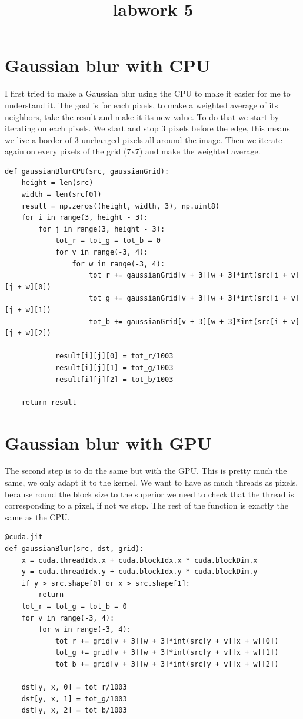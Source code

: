\documentclass{report}
\begin{document}
\title{labwork 5}
\maketitle

\section{Gaussian blur with CPU}
I first tried to make a Gaussian blur using the CPU to make it easier for me to understand it. The goal is for each pixels, to make a weighted average of its neighbors, take the result and make it its new value.
\newline
\newline
To do that we start by iterating on each pixels. We start and stop 3 pixels before the edge, this means we live a border of 3 unchanged pixels all around the image.
\newline
Then we iterate again on every pixels of the grid (7x7) and make the weighted average.
\begin{lstlisting}
def gaussianBlurCPU(src, gaussianGrid):
    height = len(src)
    width = len(src[0])
    result = np.zeros((height, width, 3), np.uint8)
    for i in range(3, height - 3):
        for j in range(3, height - 3):
            tot_r = tot_g = tot_b = 0
            for v in range(-3, 4):
                for w in range(-3, 4):
                    tot_r += gaussianGrid[v + 3][w + 3]*int(src[i + v][j + w][0])
                    tot_g += gaussianGrid[v + 3][w + 3]*int(src[i + v][j + w][1])
                    tot_b += gaussianGrid[v + 3][w + 3]*int(src[i + v][j + w][2])
        
            result[i][j][0] = tot_r/1003
            result[i][j][1] = tot_g/1003
            result[i][j][2] = tot_b/1003

    return result
\end{lstlisting}
\newpage
\section{Gaussian blur with GPU}
The second step is to do the same but with the GPU. This is pretty much the same, we only adapt it to the kernel. We want to have as much threads as pixels, because round the block size to the superior we need to check that the thread is corresponding to a pixel, if not we stop.
\newline
\newline
The rest of the function is exactly the same as the CPU.
\begin{lstlisting}
@cuda.jit
def gaussianBlur(src, dst, grid):
    x = cuda.threadIdx.x + cuda.blockIdx.x * cuda.blockDim.x
    y = cuda.threadIdx.y + cuda.blockIdx.y * cuda.blockDim.y
    if y > src.shape[0] or x > src.shape[1]:
        return
    tot_r = tot_g = tot_b = 0
    for v in range(-3, 4):
        for w in range(-3, 4):
            tot_r += grid[v + 3][w + 3]*int(src[y + v][x + w][0])
            tot_g += grid[v + 3][w + 3]*int(src[y + v][x + w][1])
            tot_b += grid[v + 3][w + 3]*int(src[y + v][x + w][2])

    dst[y, x, 0] = tot_r/1003
    dst[y, x, 1] = tot_g/1003
    dst[y, x, 2] = tot_b/1003
\end{lstlisting}
\end{document}
